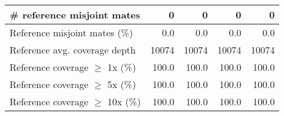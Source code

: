 \documentclass[12pt,a4paper]{article}
\begin{document}
\begin{table}[ht]
\begin{center}
\begin{tabular}{|l*{4}{|r}|}
\# reference misjoint mates & 0 & 0 & 0 & 0 \\ \hline
Reference misjoint mates (\%) & 0.0 & 0.0 & 0.0 & 0.0 \\ \hline
Reference avg. coverage depth & 10074 & 10074 & 10074 & 10074 \\ \hline
Reference coverage $\geq$ 1x (\%) & 100.0 & 100.0 & 100.0 & 100.0 \\ \hline
Reference coverage $\geq$ 5x (\%) & 100.0 & 100.0 & 100.0 & 100.0 \\ \hline
Reference coverage $\geq$ 10x (\%) & 100.0 & 100.0 & 100.0 & 100.0 \\ \hline
\end{tabular}
\end{center}
\end{table}
\end{document}
